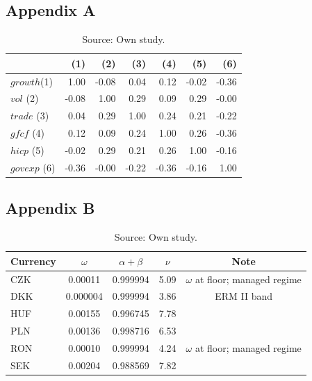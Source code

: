 \label{sec:appendix_list}
\subsection{Appendix A}\label{appendA}

\begin{table}[H]
    \centering
    \caption{Correlation matrix}
    \vspace{\baselineskip}
    \begin{tabular}{lrrrrrr}
        \toprule
        & (1) & (2) & (3) & (4) & (5)&(6) \\
        \midrule
        $growth$(1)& 1.00 & -0.08 & 0.04 & 0.12 & -0.02 & -0.36 \\
        $vol$ (2) & -0.08 & 1.00 & 0.29 & 0.09 & 0.29 & -0.00 \\
        $trade$ (3)& 0.04 & 0.29 & 1.00 & 0.24 & 0.21 & -0.22 \\
        $gfcf$ (4)& 0.12 & 0.09 & 0.24 & 1.00 & 0.26 & -0.36 \\
        $hicp$ (5)& -0.02 & 0.29 & 0.21 & 0.26 & 1.00 & -0.16 \\
        $govexp$ (6)& -0.36 & -0.00 & -0.22 & -0.36 & -0.16 & 1.00 \\
        \bottomrule
    \end{tabular}
    \vspace{\baselineskip}
    \caption*{\footnotesize Source: Own study.}
\end{table}

\subsection{Appendix B}\label{appendB}
\begin{table}[H]
    \centering
    \caption{GARCH(1,1)-t estimates.}
    \vspace{\baselineskip}
    \begin{tabular}{lcccc}
        \toprule
        \textbf{Currency} & \textbf{$\omega$} & \textbf{$\alpha+\beta$} & \textbf{$\nu$} & \textbf{Note} \\
        \midrule
        CZK & 0.00011 & 0.999994 & 5.09 & $\omega$ at floor; managed regime \\
        DKK & 0.000004 & 0.999994 & 3.86 & ERM II band \\
        HUF & 0.00155 & 0.996745 & 7.78 &  \\
        PLN & 0.00136 & 0.998716 & 6.53 &  \\
        RON & 0.00010 & 0.999994 & 4.24 & $\omega$ at floor; managed regime \\
        SEK & 0.00204 & 0.988569 & 7.82 &  \\
        \bottomrule
    \end{tabular}
    \vspace{\baselineskip}
    \caption*{\footnotesize Source: Own study. }
    \label{app:garch}
\end{table}

